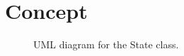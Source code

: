 \chapter{Concept}

\begin{figure}[ht]
    \centering
    \caption{UML diagram for the State class.}
    \label{fig:stateuml}
\end{figure}
